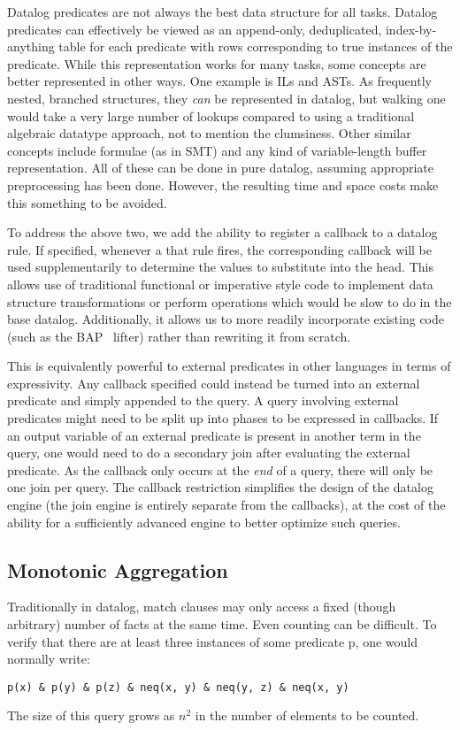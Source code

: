 Datalog predicates are not always the best data structure for all tasks.
Datalog predicates can effectively be viewed as an append-only, deduplicated, index-by-anything table for each predicate with rows corresponding to true instances of the predicate.
While this representation works for many tasks, some concepts are better represented in other ways.
One example is ILs and ASTs.
As frequently nested, branched structures, they \emph{can} be represented in datalog, but walking one would take a very large number of lookups compared to using a traditional algebraic datatype approach, not to mention the clumsiness.
Other similar concepts include formulae (as in SMT) and any kind of variable-length buffer representation.
All of these can be done in pure datalog, assuming appropriate preprocessing has been done.
However, the resulting time and space costs make this something to be avoided.

To address the above two, we add the ability to register a callback to a datalog rule.
If specified, whenever a that rule fires, the corresponding callback will be used supplementarily to determine the values to substitute into the head.
This allows use of traditional functional or imperative style code to implement data structure transformations or perform operations which would be slow to do in the base datalog.
Additionally, it allows us to more readily incorporate existing code (such as the BAP~\cite{bap} lifter) rather than rewriting it from scratch.

This is equivalently powerful to external predicates in other languages in terms of expressivity.
Any callback specified could instead be turned into an external predicate and simply appended to the query.
A query involving external predicates might need to be split up into phases to be expressed in callbacks.
If an output variable of an external predicate is present in another term in the query, one would need to do a secondary join after evaluating the external predicate.
As the callback only occurs at the \emph{end} of a query, there will only be one join per query.
The callback restriction simplifies the design of the datalog engine (the join engine is entirely separate from the callbacks), at the cost of the ability for a sufficiently advanced engine to better optimize such queries.

\subsection{Monotonic Aggregation}
Traditionally in datalog, match clauses may only access a fixed (though arbitrary) number of facts at the same time.
Even counting can be difficult.
To verify that there are at least three instances of some predicate p, one would normally write:
\begin{verbatim}
p(x) & p(y) & p(z) & neq(x, y) & neq(y, z) & neq(x, y)
\end{verbatim}
The size of this query grows as $n^2$ in the number of elements to be counted.

